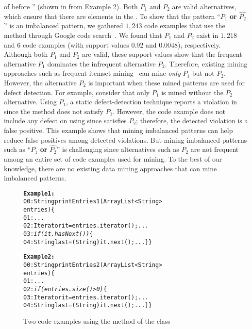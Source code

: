 of  before '' (shown in  from Example 2). Both $P_1$ and $P_2$ are valid alternatives, which ensure that there are elements in the . To show that the pattern ``$P_1$ \textbf{or} $\hat{P_2}$'' is an imbalanced pattern, we gathered $1,243$ code examples that use the  method through Google code search~\cite{GCSE}. We found that $P_1$ and $P_2$ exist in $1,218$ and $6$ code examples (with support values $0.92$ and $0.0048$), respectively. Although both $P_1$ and $P_2$ are valid, these support values show that the frequent alternative $P_1$ dominates the infrequent alternative $P_2$. Therefore, existing mining approaches such as frequent itemset mining~\cite{Burdick01mafia} can mine \emph{only} $P_1$ but not $P_2$. However, the alternative $P_2$ is important when these mined patterns are used for defect detection. For example, consider that only $P_1$ is mined without the $P_2$ alternative. Using $P_1$, a static defect-detection technique reports a violation in  since the method does not satisfy $P_1$. However, the code example does not include any defect on using  since  satisfies $P_2$; therefore, the detected violation is a false positive. This example shows that mining imbalanced patterns can help reduce false positives among detected violations. But mining imbalanced patterns such as ``$P_1$ \textbf{or} $\hat{P_2}$'' is challenging since alternatives such as $P_2$ are not frequent among an entire set of code examples used for mining. To the best of our knowledge, there are no existing data mining approaches that can mine imbalanced patterns.

\begin{figure}[t]
\begin{CodeOut}
\begin{alltt}
\textbf{Example 1:}
00:String printEntries1(ArrayList<String> 
\hspace*{0.8in}entries)\{
01:\hspace*{0.1in}...
02:\hspace*{0.1in}Iterator it = entries.iterator();...
03:\hspace*{0.1in}\emph{if (it.hasNext()) }\{
04:\hspace*{0.3in}String last = (String) it.next();... \}\}

\textbf{Example 2:}
00:String printEntries2(ArrayList<String> 
\hspace*{0.8in}entries)\{
01:\hspace*{0.1in}...
02:\hspace*{0.1in}\emph{if (entries.size() > 0) }\{
03:\hspace*{0.3in}Iterator it = entries.iterator();...
04:\hspace*{0.3in}String last = (String) it.next();... \}\}
\end{alltt}
\end{CodeOut}\vspace*{-3ex}
\caption{Two code examples using the  method of the 
class\label{fig:introexample}}\vspace*{-3ex}
\end{figure}

